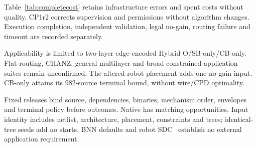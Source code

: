 \documentclass[conference,10pt]{IEEEtran}
\begin{document}
Table~\ref{tab:completecost} retains infrastructure errors and spent costs without quality. CP1r2 corrects supervision and permissions without algorithm changes. Execution completion, independent validation, legal no-gain, routing failure and timeout are recorded separately.

Applicability is limited to two-layer edge-encoded Hybrid-O/SB-only/CB-only. Flat routing, CHANZ, general multilayer and broad constrained application suites remain unconfirmed. The altered robot placement adds one no-gain input. CB-only attains its 982-source terminal bound, without wire/CPD optimality.

Fixed releases bind source, dependencies, binaries, mechanism order, envelopes and terminal policy before outcomes. Native has matching opportunities. Input identity includes netlist, architecture, placement, constraints and trees; identical-tree seeds add no starts. BNN defaults and robot SDC~\cite{vprsdc} establish no external application requirement.
\end{document}
